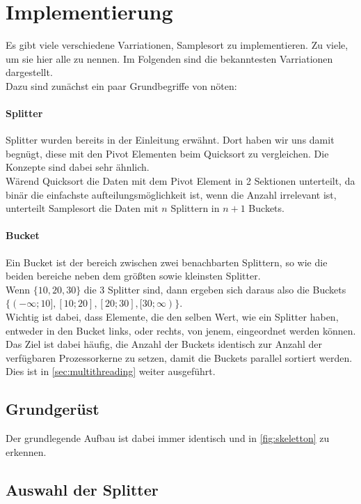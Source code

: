 \section{Implementierung}
Es gibt viele verschiedene Varriationen, Samplesort zu implementieren. Zu viele, um sie hier alle zu nennen.
Im Folgenden sind die bekanntesten Varriationen dargestellt.\\
Dazu sind zun\"achst ein paar Grundbegriffe von n\"oten:
\paragraph{Splitter}
Splitter wurden bereits in der Einleitung erwähnt.
Dort haben wir uns damit begn\"ugt, diese mit den Pivot Elementen beim Quicksort zu vergleichen.
Die Konzepte sind dabei sehr \"ahnlich.\\
W\"arend Quicksort die Daten mit dem Pivot Element in 2 Sektionen unterteilt, da bin\"ar die einfachste aufteilungsm\"oglichkeit ist, wenn die Anzahl irrelevant ist, unterteilt Samplesort die Daten mit $n$ Splittern in $n+1$ Buckets.
\paragraph{Bucket}
Ein Bucket ist der bereich zwischen zwei benachbarten Splittern, so wie die beiden bereiche neben dem gr\"oßten sowie kleinsten Splitter.\\
Wenn $\{10, 20, 30\}$ die 3 Splitter sind, dann ergeben sich daraus also die Buckets $\{(-\infty;10],\allowbreak [10;20],\allowbreak [20;30],\allowbreak [30;\infty)\}$.\\
Wichtig ist dabei, dass Elemente, die den selben Wert, wie ein Splitter haben, entweder in den Bucket links, oder rechts, von jenem, eingeordnet werden k\"onnen.\\
Das Ziel ist dabei h\"aufig, die Anzahl der Buckets identisch zur Anzahl der verf\"ugbaren Prozessorkerne zu setzen, damit die Buckets parallel sortiert werden. Dies ist in \ref{sec:multithreading} weiter ausgef\"uhrt.

\subsection{Grundger\"ust}
Der grundlegende Aufbau ist dabei immer identisch und in \ref{fig:skeletton} zu erkennen.


\subsection{Auswahl der Splitter}

